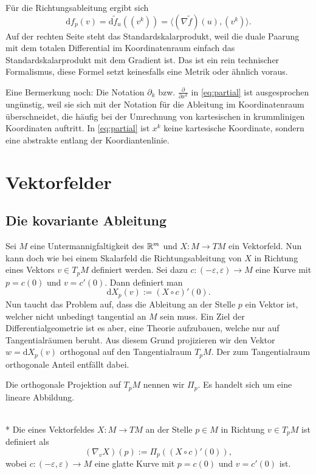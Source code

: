 Für die Richtungsableitung ergibt sich
\begin{equation}\label{eq:Richtungsableitung-lokal}
\mathrm df_p(v) = \mathrm d\tilde f_u((v^k)) =
\langle(\nabla \tilde f)(u),(v^k)\rangle.
\end{equation}
Auf der rechten Seite steht das Standardskalarprodukt, weil die
duale Paarung mit dem totalen Differential im Koordinatenraum einfach
das Standardskalarprodukt mit dem Gradient ist. Das ist ein rein
technischer Formalismus, diese Formel setzt keinesfalls eine
Metrik oder ähnlich voraus.

Eine Bermerkung noch: Die Notation
$\partial_k$ bzw. $\frac{\partial}{\partial x^k}$ in \eqref{eq:partial}
ist ausgesprochen ungünstig, weil sie sich mit der Notation für die
Ableitung im Koordinatenraum überschneidet, die häufig bei der
Umrechnung von kartesischen in krummlinigen Koordinaten auftritt.
In \eqref{eq:partial} ist $x^k$ keine kartesische Koordinate,
sondern eine abstrakte entlang der Koordiantenlinie.


\section{Vektorfelder}

\subsection{Die kovariante Ableitung}

Sei $M$ eine Untermannigfaltigkeit des $\mathbb R^m$ und $X\colon M\to TM$
ein Vektorfeld. Nun kann doch wie bei einem Skalarfeld die
Richtungsableitung von $X$ in Richtung
eines Vektors $v\in T_p M$ definiert werden. Sei dazu
$c\colon (-\varepsilon,\varepsilon)\to M$ eine Kurve
mit $p=c(0)$ und $v=c'(0)$. Dann definiert man%
\begin{equation}
\mathrm dX_p(v) := (X\circ c)'(0).
\end{equation}
Nun taucht das Problem auf, dass die Ableitung an der Stelle $p$
ein Vektor ist, welcher nicht unbedingt tangential an $M$ sein muss.
Ein Ziel der Differentialgeometrie ist es aber, eine Theorie aufzubauen,
welche nur auf Tangentialräumen beruht. Aus diesem Grund projizieren
wir den Vektor $w=\mathrm dX_p(v)$ orthogonal auf den Tangentialraum
$T_p M$. Der zum Tangentialraum orthogonale Anteil entfällt dabei.

Die orthogonale Projektion auf $T_p M$ nennen wir $\Pi_p$. Es handelt
sich um eine lineare Abbildung.

\begin{definition}%
\mbox{}\\*
Die  eines Vektorfeldes $X\colon M\to TM$
an der Stelle $p\in M$ in Richtung $v\in T_p M$ ist definiert als
\begin{equation}
(\nabla_v X)(p) := \Pi_p((X\circ c)'(0)),
\end{equation}
wobei $c\colon (-\varepsilon,\varepsilon)\to M$ eine glatte Kurve
mit $p=c(0)$ und $v=c'(0)$ ist.
\end{definition}

